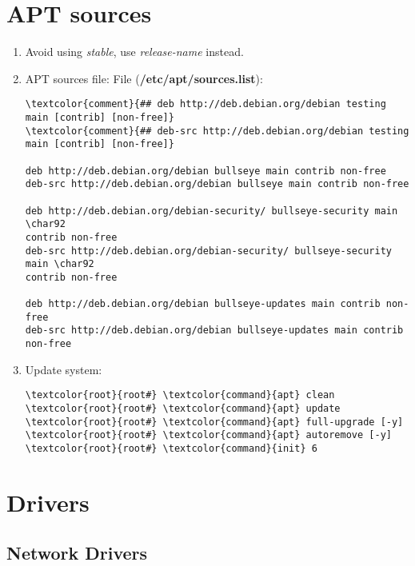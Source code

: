 \documentclass[10pt, a4paper, onecolumn, openany]{book} %
\begin{document}
\section{APT sources}
\begin{enumerate}
    \item Avoid using \textit{stable}, use \textit{release-name} instead.
    \item APT sources file:
\newline File (\textbf{\textcolor{file}{/etc/apt/sources.list}}):
\begin{Verbatim}[commandchars=\\\{\}]
\textcolor{comment}{## deb http://deb.debian.org/debian testing main [contrib] [non-free]}
\textcolor{comment}{## deb-src http://deb.debian.org/debian testing main [contrib] [non-free]}

deb http://deb.debian.org/debian bullseye main contrib non-free
deb-src http://deb.debian.org/debian bullseye main contrib non-free

deb http://deb.debian.org/debian-security/ bullseye-security main \char92
contrib non-free
deb-src http://deb.debian.org/debian-security/ bullseye-security main \char92
contrib non-free

deb http://deb.debian.org/debian bullseye-updates main contrib non-free
deb-src http://deb.debian.org/debian bullseye-updates main contrib non-free
\end{Verbatim}
    \item Update system:
\begin{Verbatim}[commandchars=\\\{\}]
\textcolor{root}{root#} \textcolor{command}{apt} clean
\textcolor{root}{root#} \textcolor{command}{apt} update
\textcolor{root}{root#} \textcolor{command}{apt} full-upgrade [-y]
\textcolor{root}{root#} \textcolor{command}{apt} autoremove [-y]
\textcolor{root}{root#} \textcolor{command}{init} 6
\end{Verbatim}
\end{enumerate}
\section{Drivers}
\subsection{Network Drivers}
\end{document}
